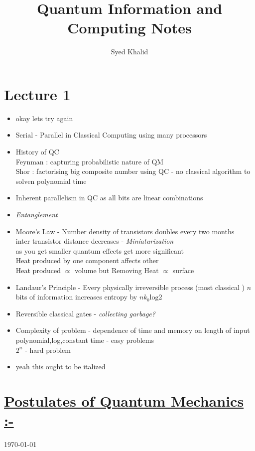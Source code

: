 \documentclass{article}
\title{\textbf{Quantum Information and Computing Notes}}
\author{Syed Khalid}
\begin{document}
\maketitle
\section{Lecture 1}

\begin{itemize}
    \item okay lets try again  
    \item Serial - Parallel in Classical Computing using many processors
    \item History of QC \\
    Feynman : capturing probabilistic nature of QM\\
    Shor : factorising big composite number  using QC - no classical algorithm to solven polynomial time\\
    
    \item Inherent parallelism in QC as all bits are linear combinations
    \item \textit{Entanglement} 
    \item Moore's Law - Number density of transistors doubles every two months\\
    inter transistor distance decreases - \textit{Miniaturization}\\
    as you get smaller quantum effects get more significant 
    \\ Heat produced by one component affects other \\
    Heat produced $\propto$ volume but Removing Heat $\propto$ surface
    \item  Landaur's Principle - Every physically irreversible process (most classical ) 
    $n$  bits of information increases entropy by $nk_{b} \mathrm{log} 2$
    \item Reversible classical gates - \textit{collecting garbage?}
    \item Complexity of problem - dependence of time and memory on length of input\\
    polynomial,log,constant time - easy problems\\
    $2^{n}$ - hard problem\\ 
  \item yeah this ought to be italized
\end{itemize}

\section{\uline{Postulates of Quantum Mechanics :-}} 
\begin{flushright}
\today
\end{flushright}
\end{document}
